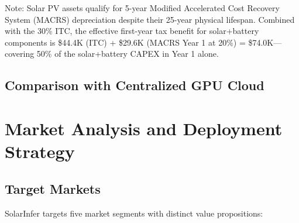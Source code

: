 \documentclass[conference,10pt,letterpaper]{IEEEtran}
\begin{document}
Note: Solar PV assets qualify for 5-year Modified Accelerated Cost Recovery System (MACRS) depreciation despite their 25-year physical lifespan. Combined with the 30\% ITC, the effective first-year tax benefit for solar+battery components is \$44.4K (ITC) + \$29.6K (MACRS Year 1 at 20\%) = \$74.0K---covering 50\% of the solar+battery CAPEX in Year 1 alone.

\subsection{Comparison with Centralized GPU Cloud}

\begin{table}[!t]
\caption{SolarInfer Edge vs.\ Centralized GPU Cloud}
\label{tab:vscloud}
\centering\scriptsize
{}
\end{table}



\section{Market Analysis and Deployment Strategy}
\label{sec:market}

\subsection{Target Markets}

SolarInfer targets five market segments with distinct value propositions:
\end{document}
